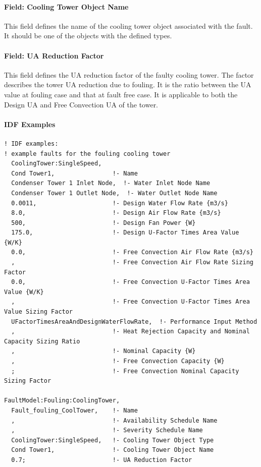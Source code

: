 \paragraph{Field: Cooling Tower Object Name}\label{field-tower-object-name}

This field defines the name of the cooling tower object associated with the fault. It should be one of the objects with the defined types.

\paragraph{Field: UA Reduction Factor}\label{field-ua-reduction-factor}

This field defines the UA reduction factor of the faulty cooling tower. The factor describes the tower UA reduction due to fouling. It is the ratio between the UA value at fouling case and that at fault free case. It is applicable to both the Design UA and Free Convection UA of the tower.

\paragraph{IDF Examples}

\begin{lstlisting}
! IDF examples:
! example faults for the fouling cooling tower
  CoolingTower:SingleSpeed,
  Cond Tower1,                !- Name
  Condenser Tower 1 Inlet Node,  !- Water Inlet Node Name
  Condenser Tower 1 Outlet Node,  !- Water Outlet Node Name
  0.0011,                     !- Design Water Flow Rate {m3/s}
  8.0,                        !- Design Air Flow Rate {m3/s}
  500,                        !- Design Fan Power {W}
  175.0,                      !- Design U-Factor Times Area Value {W/K}
  0.0,                        !- Free Convection Air Flow Rate {m3/s}
  ,                           !- Free Convection Air Flow Rate Sizing Factor
  0.0,                        !- Free Convection U-Factor Times Area Value {W/K}
  ,                           !- Free Convection U-Factor Times Area Value Sizing Factor
  UFactorTimesAreaAndDesignWaterFlowRate,  !- Performance Input Method
  ,                           !- Heat Rejection Capacity and Nominal Capacity Sizing Ratio
  ,                           !- Nominal Capacity {W}
  ,                           !- Free Convection Capacity {W}
  ;                           !- Free Convection Nominal Capacity Sizing Factor

FaultModel:Fouling:CoolingTower,
  Fault_fouling_CoolTower,    !- Name
  ,                           !- Availability Schedule Name
  ,                           !- Severity Schedule Name
  CoolingTower:SingleSpeed,   !- Cooling Tower Object Type
  Cond Tower1,                !- Cooling Tower Object Name
  0.7;                        !- UA Reduction Factor
\end{lstlisting}


